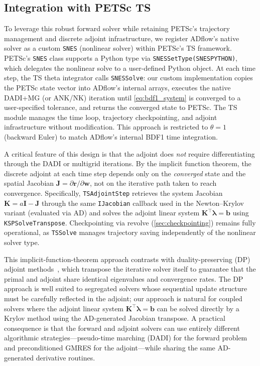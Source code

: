 \documentclass[journal]{new-aiaa}
\newcommand{\mb}[1]{\mathbf{#1}}
\newcommand{\mbg}[1]{\bm{#1}}
\newcommand{\p}{\partial}
\begin{document}
\subsection{Integration with PETSc TS}\label{sec:dadi_petsc}
To leverage this robust forward solver while retaining PETSc's trajectory management and discrete adjoint infrastructure, we register ADflow's native solver as a custom \texttt{SNES} (nonlinear solver) within PETSc's TS framework.
PETSc's \texttt{SNES} class supports a Python type via \texttt{SNESSetType(SNESPYTHON)}, which delegates the nonlinear solve to a user-defined Python object.
At each time step, the TS theta integrator calls \texttt{SNESSolve}: our custom implementation copies the PETSc state vector into ADflow's internal arrays, executes the native DADI+MG (or ANK/NK) iteration until \cref{eq:bdf1_system} is converged to a user-specified tolerance, and returns the converged state to PETSc.
The TS module manages the time loop, trajectory checkpointing, and adjoint infrastructure without modification.
This approach is restricted to $\theta = 1$ (backward Euler) to match ADflow's internal BDF1 time integration.

A critical feature of this design is that the adjoint does \emph{not} require differentiating through the DADI or multigrid iterations.
By the implicit function theorem, the discrete adjoint at each time step depends only on the \emph{converged} state and the spatial Jacobian $\mb{J} = \p\mb{r}/\p\mb{w}$, not on the iterative path taken to reach convergence.
Specifically, \texttt{TSAdjointStep} retrieves the system Jacobian $\mb{K} = a\mb{I} - \mb{J}$ through the same \texttt{IJacobian} callback used in the Newton--Krylov variant (evaluated via AD) and solves the adjoint linear system $\mb{K}^\intercal \mbg{\lambda} = \mb{b}$ using \texttt{KSPSolveTranspose}.
Checkpointing via revolve (\cref{sec:checkpointing}) remains fully operational, as \texttt{TSSolve} manages trajectory saving independently of the nonlinear solver type.

This implicit-function-theorem approach contrasts with duality-preserving (DP) adjoint methods~\cite{Fang2024}, which transpose the iterative solver itself to guarantee that the primal and adjoint share identical eigenvalues and convergence rates.
The DP approach is well suited to segregated solvers whose sequential update structure must be carefully reflected in the adjoint; our approach is natural for coupled solvers where the adjoint linear system $\mb{K}^\intercal \mbg{\lambda} = \mb{b}$ can be solved directly by a Krylov method using the AD-generated Jacobian transpose.
A practical consequence is that the forward and adjoint solvers can use entirely different algorithmic strategies---pseudo-time marching (DADI) for the forward problem and preconditioned GMRES for the adjoint---while sharing the same AD-generated derivative routines.
\end{document}
